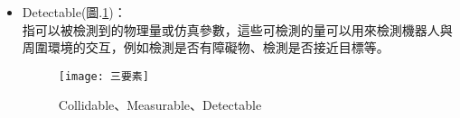 \begin{itemize}
\item Detectable(圖.\ref{Collidable、Measurable、Detectable})：\\
指可以被檢測到的物理量或仿真參數，這些可檢測的量可以用來檢測機器人與周圍環境的交互，例如檢測是否有障礙物、檢測是否接近目標等。\\
\begin{figure}[hbt!]
\begin{center}
\texttt{[image: 三要素]}
\caption{\Large Collidable、Measurable、Detectable}\label{Collidable、Measurable、Detectable}
\end{center}
\end{figure}
\\
\end{itemize}
\newpage
